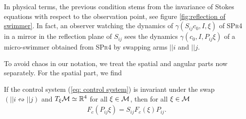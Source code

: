 \begin{remark}
In physical terms, the previous condition stems from the invariance of Stokes equations with respect to the observation point, see figure \ref{fig:reflection of swimmer}. In fact, an observer watching the dynamics of $\gamma(S_{ij}c_0, I, \xi)$ of \textsc{SPr4} in a mirror in the reflection plane of $S_{ij}$ sees the dynamics $\gamma(c_0, I, P_{ij} \xi)$ of a micro-swimmer obtained from \textsc{SPr4} by swapping arms $||i$ and $||j$.
\end{remark}


To avoid chaos in our notation, we treat the spatial and angular parts now separately. For the spatial part, we find

\begin{proposition}
\label{prop: spatial permutation invariance}
If the control system (\ref{eq: control system}) is invariant under the swap $(||i \leftrightsquigarrow ||j)$ and $T_{\xi} \mathcal{M} \simeq \mathbb{R}^4$ for all $\xi \in \mathcal{M}$, then for all $\xi \in \mathcal{M}$
\begin{align}
	 F_c(P_{ij} \xi) = S_{ij} F_c(\xi) P_{ij}.
\end{align}
\end{proposition}

